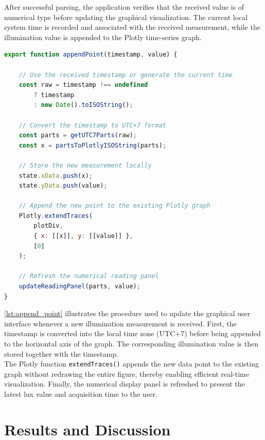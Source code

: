 \documentclass[11pt]{article}
\begin{document}
After successful parsing, the application verifies that the received value is of numerical type before updating the graphical visualization. The current local system time is recorded and associated with the received measurement, while the illumination value is appended to the Plotly \cite{plotly_js} time-series graph.

\begin{lstlisting}[language=JavaScript,
caption={Updating the real-time Plotly graph.},
label={lst:append_point}]
export function appendPoint(timestamp, value) {

    // Use the received timestamp or generate the current time
    const raw = timestamp !== undefined
        ? timestamp
        : new Date().toISOString();

    // Convert the timestamp to UTC+7 format
    const parts = getUTC7Parts(raw);
    const x = partsToPlotlyISOString(parts);

    // Store the new measurement locally
    state.xData.push(x);
    state.yData.push(value);

    // Append the new point to the existing Plotly graph
    Plotly.extendTraces(
        plotDiv,
        { x: [[x]], y: [[value]] },
        [0]
    );

    // Refresh the numerical reading panel
    updateReadingPanel(parts, value);
}
\end{lstlisting}

\vspace{0.5em}

\autoref{lst:append_point} illustrates the procedure used to update the graphical user interface whenever a new illumination measurement is received. First, the timestamp is converted into the local time zone (UTC+7) before being appended to the horizontal axis of the graph. The corresponding illumination value is then stored together with the timestamp.\\[0.1em]

The Plotly function \texttt{extendTraces()} appends the new data point to the existing graph without redrawing the entire figure, thereby enabling efficient real-time visualization. Finally, the numerical display panel is refreshed to present the latest lux value and acquisition time to the user.

\section{Results and Discussion}
\end{document}
